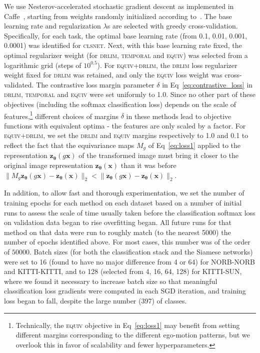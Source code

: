 \documentclass[10pt,twocolumn,letterpaper]{article}
\begin{document}
We use Nesterov-accelerated stochastic gradient descent as implemented in Caffe~\cite{caffe}, starting from weights randomly initialized according to~\cite{xavier}. The base learning rate and regularization $\lambda$s are selected with greedy cross-validation.
Specifically, for each task, the optimal base learning rate (from 0.1, 0.01, 0.001, 0.0001) was identified for \textsc{clsnet}. Next, with this base learning rate fixed, the optimal regularizer weight  (for \textsc{drlim}, \textsc{temporal} and \textsc{equiv}) was selected from a logarithmic grid (steps of $10^{0.5}$). For \textsc{equiv+drlim}, the \textsc{drlim} loss regularizer weight fixed for \textsc{drlim} was retained, and only the \textsc{equiv} loss weight was cross-validated.
The contrastive loss margin parameter $\delta$ in Eq~\eqref{eq:contrastive_loss}
 in \textsc{drlim}, \textsc{temporal} and \textsc{equiv} were set uniformly to 1.0.
Since no other part of these objectives (including the softmax classification loss) depends on the scale of features,\footnote{Technically, the \textsc{equiv} objective in Eq~\eqref{eq:loss1} may benefit from setting different margins corresponding to the different ego-motion patterns, but we overlook this in favor of scalability and fewer hyperparameters.} different choices of margins $\delta$ in these methods lead to objective functions with equivalent optima - the features are only scaled by a factor.
For \textsc{equiv+drlim}, we set the \textsc{drlim} and \textsc{equiv} margins respectively to 1.0 and 0.1
to reflect the fact that the equivariance maps $M_g$ of Eq~\eqref{eq:loss1} applied to the representation $\mathbf{z_{\bm{\theta}}}(g\bm{x})$ of the transformed image must bring it closer to the original image representation $\mathbf{z_{\bm{\theta}}}(\bm{x})$ than it was before \ie$\|M_g \mathbf{z_{\bm{\theta}}}(g\bm{x})- \mathbf{z_{\bm{\theta}}}(\bm{x})\|_2 < \|\mathbf{z_{\bm{\theta}}}(g\bm{x}) - \mathbf{z_{\bm{\theta}}}(\bm{x})\|_2$. %

In addition, to allow fast and thorough experimentation, we set the number of training epochs for each method on each dataset based on a number of initial runs to assess the scale of time usually taken before the classification softmax loss on validation data began to rise \ie overfitting began. All future runs for that method on that data were run to roughly match (to the nearest 5000) the number of epochs identified above. For most cases, this number was of the order of $50000$. Batch sizes (for both the classification stack and the Siamese networks) were set to 16 (found to have no major difference from 4 or 64) for NORB-NORB and KITTI-KITTI, and to 128 (selected from 4, 16, 64, 128) for KITTI-SUN, where we found it necessary to increase batch size so that meaningful classification loss gradients were computed in each SGD iteration, and training loss began to fall, despite the large number (397) of classes.
\end{document}
